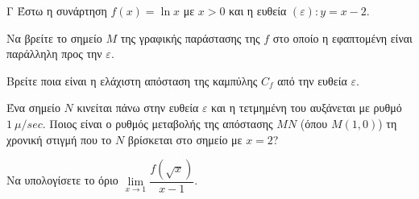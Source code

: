 \begin{thema}{Γ}
Έστω η συνάρτηση $f(x) = \ln x$ με $x > 0$ και η ευθεία $(\varepsilon): y = x - 2$.
\begin{erwthma}
  \item Να βρείτε το σημείο $M$ της γραφικής παράστασης της $f$ στο οποίο η εφαπτομένη είναι παράλληλη προς την $\varepsilon$. 
  \item Βρείτε ποια είναι η ελάχιστη απόσταση της καμπύλης $C_f$ από την ευθεία $\varepsilon$.
  \item Ένα σημείο $N$ κινείται πάνω στην ευθεία $\varepsilon$ και η τετμημένη του αυξάνεται με ρυθμό $1\ \mu/\si{sec}$. Ποιος είναι ο ρυθμός μεταβολής της απόστασης $MN$ (όπου $M(1,0)$) τη χρονική στιγμή που το $N$ βρίσκεται στο σημείο με $x=2$?
  \item Να υπολογίσετε το όριο $\lim\limits_{x \to 1} \dfrac{f(\sqrt{x})}{x-1}$.
\end{erwthma}
\end{thema}
